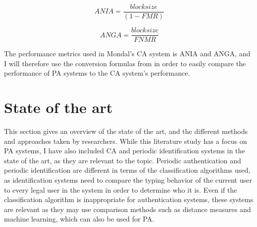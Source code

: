 \documentclass[informationsecurity]{gucmasterproject}
\begin{document}
\begin{equation}
ANIA = \frac{block size}{(1-FMR)}
\end{equation}

\begin{equation}
ANGA = \frac{block size}{FNMR}
\end{equation}

The performance metrics used in Mondal's \cite{mondal} CA system is ANIA and ANGA, and I will therefore use the conversion formulas from \cite{CA-performance} in order to easily compare the performance of PA systems to the CA system's performance.




%



\chapter{State of the art}
\label{chap:state}
This section gives an overview of the state of the art, and the different methods and approaches taken by researchers.
While this literature study has a focus on PA systems, I have also included CA \cite{BOURS201236, mondal} and periodic identification systems \cite{Solami, Janakiraman2007, Monrose} in the state of the art, as they are relevant to the topic.
Periodic authentication and periodic identification are different in terms of the classification algorithms used, as identification systems need to compare the typing behavior of the current user to every legal user in the system in order to determine who it is.
Even if the classification algorithm is inappropriate for authentication systems, these systems are relevant as they may use comparison methods such as distance measures and machine learning, which can also be used for PA.
\end{document}

